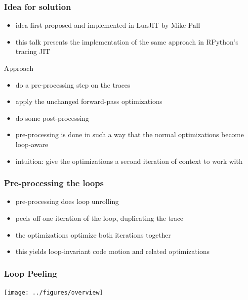 \documentclass[utf8x]{beamer}
\begin{document}
\begin{frame}
  \frametitle{Idea for solution}
  \begin{itemize}
      \item idea first proposed and implemented in LuaJIT by Mike Pall
      \item this talk presents the implementation of the same approach in RPython's tracing JIT
  \end{itemize}
  \pause
  \begin{block}{Approach}
      \begin{itemize}
          \item do a pre-processing step on the traces
          \item apply the unchanged forward-pass optimizations
          \item do some post-processing
          \item pre-processing is done in such a way that the normal optimizations become loop-aware
          \pause
          \item intuition: give the optimizations a second iteration of context to work with
      \end{itemize}
  \end{block}
\end{frame}

\begin{frame}
  \frametitle{Pre-processing the loops}
  \begin{itemize}
      \item pre-processing does loop unrolling
      \item peels off one iteration of the loop, duplicating the trace
      \item the optimizations optimize both iterations together
      \item this yields loop-invariant code motion and related optimizations
  \end{itemize}
\end{frame}

\begin{frame}
  \frametitle{Loop Peeling}
\begin{center}
\texttt{[image: ../figures/overview]}
\end{center}
\end{frame}
\end{document}
